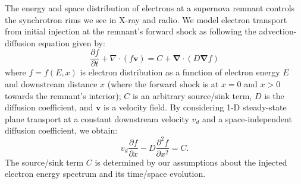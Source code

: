 \documentclass[iop, apj, numberedappendix, twocolappendix]{emulateapj}
\newcommand*{\ptl}{\partial}
\newcommand*{\del}{\nabla}
\renewcommand{\vec}[1]{\mathbf{#1}}
\begin{document}
The energy and space distribution of electrons at a supernova remnant
controls the synchrotron rims we see in X-ray and radio.  We model electron
transport from initial injection at the remnant's forward shock as following
the advection-diffusion equation given by:
\begin{equation}
  \frac{\ptl f}{\ptl t} + \del \cdot \left( f \vec{v} \right)
  = C + \vec{\del} \cdot \left( D \vec{\del} f \right)
\end{equation}
where $f = f(E,x)$ is electron distribution as a function of electron energy
$E$ and downstream distance $x$ (where the forward shock is at $x=0$ and
$x>0$ towards the remnant's interior); $C$ is an arbitrary source/sink term,
$D$ is the diffusion coefficient, and $\vec{v}$ is a velocity field.
By considering 1-D steady-state plane transport at a constant downstream
velocity $v_d$  and a space-independent diffusion
coefficient, we obtain:
\begin{equation}
    v_d \frac{\ptl f}{\ptl x} - D \frac{\ptl^2 f}{\ptl x^2} = C .
\end{equation}
The source/sink term $C$ is determined by our assumptions about the injected
electron energy spectrum and its time/space evolution.
\end{document}
